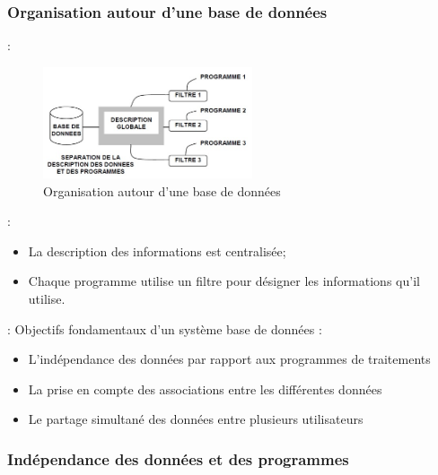 \documentclass[10pt]{beamer}
\begin{document}
\subsubsection{Organisation autour d’une base de données}
\begin{frame}{\subsecname : \subsubsecname}
    \begin{figure}
        \begin{center}
            \includegraphics[width=0.55\textwidth]{../assets/img/par_sgbd.jpg}
            \caption{Organisation autour d’une base de données}
            \label{Fig:par_sgbd}
        \end{center}
    \end{figure}
\end{frame}

\begin{frame}{\subsecname : \subsubsecname}
    \begin{itemize}
        \item La description des informations est centralisée;
        \item Chaque programme utilise un filtre pour désigner les informations qu’il utilise.
    \end{itemize}
\end{frame}

\begin{frame}{\subsecname : \subsubsecname}
    Objectifs fondamentaux d’un système base de données :
    \begin{itemize}
        \item L’indépendance des données par rapport aux programmes de traitements
        \item La prise en compte des associations entre les différentes données
        \item Le partage simultané des données entre plusieurs utilisateurs
    \end{itemize}
\end{frame}

\subsubsection{Indépendance des données et des programmes}
\end{document}
